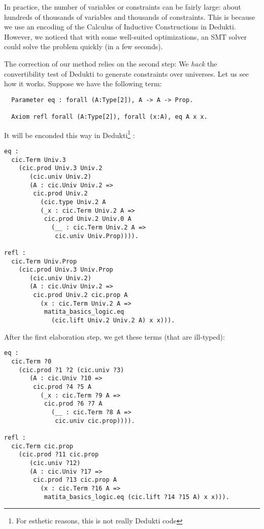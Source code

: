 \documentclass[conference]{IEEEtran}
\begin{document}
In practice, the number of variables or constraints can be fairly large: about hundreds of thousands of variables and thousands of constraints. This is because we use an encoding of the Calculus of Inductive Constructions in Dedukti. However, we noticed that with some well-suited optimizations, an SMT solver could solve the problem quickly (in a few seconds).

The correction of our method relies on the second step: We \textit{hack} the convertibility test of Dedukti to generate constraints over universes. Let us see how it works. Suppose we have the following term:

\begin{verbatim}
  Parameter eq : forall (A:Type[2]), A -> A -> Prop.

  Axiom refl forall (A:Type[2]), forall (x:A), eq A x x.
\end{verbatim}

It will be enconded this way in Dedukti\footnote{For esthetic reasons, this is not really Dedukti code} :

\begin{verbatim}
eq :
  cic.Term Univ.3
    (cic.prod Univ.3 Univ.2
       (cic.univ Univ.2)
       (A : cic.Univ Univ.2 =>
        cic.prod Univ.2
          (cic.type Univ.2 A
          (_x : cic.Term Univ.2 A =>
           cic.prod Univ.2 Univ.0 A
             (__ : cic.Term Univ.2 A =>
              cic.univ Univ.Prop)))).

refl :
  cic.Term Univ.Prop
    (cic.prod Univ.3 Univ.Prop
       (cic.univ Univ.2)
       (A : cic.Univ Univ.2 =>
        cic.prod Univ.2 cic.prop A
          (x : cic.Term Univ.2 A =>
           matita_basics_logic.eq
             (cic.lift Univ.2 Univ.2 A) x x))).
\end{verbatim}

After the first elaboration step, we get these terms (that are ill-typed):
\begin{verbatim}
eq :
  cic.Term ?0
    (cic.prod ?1 ?2 (cic.univ ?3)
       (A : cic.Univ ?10 =>
        cic.prod ?4 ?5 A
          (_x : cic.Term ?9 A =>
           cic.prod ?6 ?7 A
             (__ : cic.Term ?8 A =>
              cic.univ cic.prop)))).

refl :
  cic.Term cic.prop
    (cic.prod ?11 cic.prop
       (cic.univ ?12)
       (A : cic.Univ ?17 =>
        cic.prod ?13 cic.prop A
          (x : cic.Term ?16 A =>
           matita_basics_logic.eq (cic.lift ?14 ?15 A) x x))).
\end{verbatim}
\end{document}
